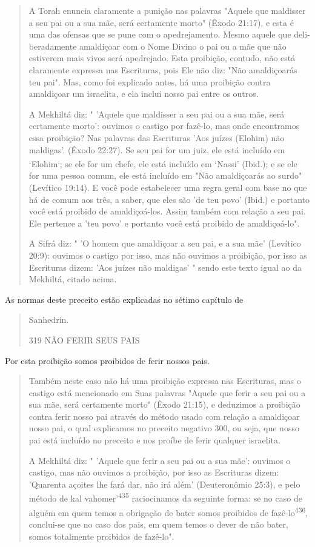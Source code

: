 \begin{quote}
A Torah enuncia claramente a punição nas palavras "Aquele que mal­disser
a seu pai ou a sua mãe, será certamente morto" (Êxodo 21:17), e esta é
uma das ofensas que se pune com o apedrejamento. Mesmo aquele que
deli­beradamente amaldiçoar com o Nome Divino o pai ou a mãe que não
estive­rem mais vivos será apedrejado. Esta proibição, contudo, não está
claramente expressa nas Escrituras, pois Ele não diz: "Não amaldiçoarás
teu pai". Mas, co­mo foi explicado antes, há uma proibição contra
amaldiçoar um israelita, e ela inclui nosso pai entre os outros.

A Mekhiltá diz: " 'Aquele que maldisser a seu pai ou a sua mãe, será
certamente morto': ouvimos o castigo por fazê-lo, mas onde encontramos
essa proibição? Nas palavras das Escrituras 'Aos juízes (Elohim) não
maldigas'. (Êxo­do 22:27). Se seu pai for um juiz, ele está incluído em
`Elohim\textsuperscript{.}; se ele for um chefe, ele está incluído em
`Nassi' (Ibid.); e se ele for uma pessoa comum, ele está incluído em
"Não amaldiçoarás ao surdo" (Levítico 19:14). E você pode estabelecer
uma regra geral com base no que há de comum aos três, a saber, que eles
são 'de teu povo' (Ibid.) e portanto você está proibido de
amaldiçoá-los. Assim também com relação a seu pai. Ele pertence a 'teu
povo' e portanto você está proibido de amaldiçoá-lo".

A Sifrá diz: " 'O homem que amaldiçoar a seu pai, e a sua mãe'
(Leví­tico 20:9): ouvimos o castigo por isso, mas não ouvimos a
proibição, por isso as Escrituras dizem: 'Aos juízes não maldigas' "
sendo este texto igual ao da Mekhiltá, citado acima.
\end{quote}

As normas deste preceito estão explicadas no sétimo capítulo de

\begin{quote}
Sanhedrin.

319 NÃO FERIR SEUS PAIS
\end{quote}

Por esta proibição somos proibidos de ferir nossos pais.

\begin{quote}
Também neste caso não há uma proibição expressa nas Escrituras, mas o
castigo está mencionado em Suas palavras "Aquele que ferir a seu pai ou
a sua mãe, será certamente morto" (Êxodo 21:15), e deduzimos a proibição
contra ferir nosso pai através do método usado com relação a amaldiçoar
nos­so pai, o qual explicamos no preceito negativo 300, ou seja, que
nosso pai está incluído no preceito e nos proíbe de ferir qualquer
israelita.

A Mekhiltá diz: " 'Aquele que ferir a seu pai ou a sua mãe': ouvimos o
castigo, mas não ouvimos a proibição, por isso as Escrituras dizem:
'Quaren­ta açoites lhe fará dar, não irá além' (Deuteronômio 25:3), e
pelo método de kal vahomer'\textsuperscript{435} raciocinamos da
seguinte forma: se no caso de alguém em quem temos a obrigação de bater
somos proibidos de fazê-lo\textsuperscript{436}, conclui-se que no caso
dos pais, em quem temos o dever de não bater, somos totalmente
proi­bidos de fazê-lo".
\end{quote}

